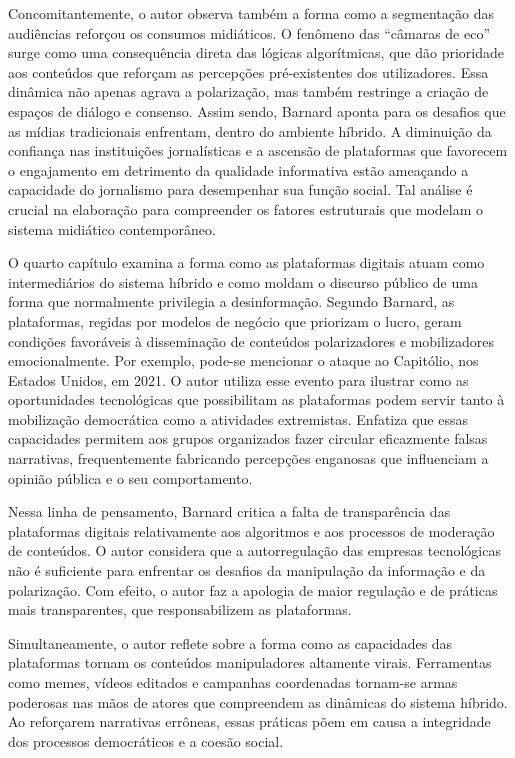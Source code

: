 \documentclass[portuguese]{textolivre}
\begin{document}
Concomitantemente, o autor observa também a forma como a segmentação das audiências reforçou os consumos midiáticos. O fenômeno das “câmaras de eco” surge como uma consequência direta das lógicas algorítmicas, que dão prioridade aos conteúdos que reforçam as percepções pré-existentes dos utilizadores. Essa dinâmica não apenas agrava a polarização, mas também restringe a criação de espaços de diálogo e consenso. Assim sendo, Barnard aponta para os desafios que as mídias tradicionais enfrentam, dentro do ambiente híbrido. A diminuição da confiança nas instituições jornalísticas e a ascensão de plataformas que favorecem o engajamento em detrimento da qualidade informativa estão ameaçando a capacidade do jornalismo para desempenhar sua função social. Tal análise é crucial na elaboração para compreender os fatores estruturais que modelam o sistema midiático contemporâneo.

O quarto capítulo examina a forma como as plataformas digitais atuam como intermediários do sistema híbrido e como moldam o discurso público de uma forma que normalmente privilegia a desinformação. Segundo Barnard, as plataformas, regidas por modelos de negócio que priorizam o lucro, geram condições favoráveis à disseminação de conteúdos polarizadores e mobilizadores emocionalmente. Por exemplo, pode-se mencionar o ataque ao Capitólio, nos Estados Unidos, em 2021. O autor utiliza esse evento para ilustrar como as oportunidades tecnológicas que possibilitam as plataformas podem servir tanto à mobilização democrática como a atividades extremistas. Enfatiza que essas capacidades permitem aos grupos organizados fazer circular eficazmente falsas narrativas, frequentemente fabricando percepções enganosas que influenciam a opinião pública e o seu comportamento. 

Nessa linha de pensamento, Barnard critica a falta de transparência das plataformas digitais relativamente aos algoritmos e aos processos de moderação de conteúdos. O autor considera que a autorregulação das empresas tecnológicas não é suficiente para enfrentar os desafios da manipulação da informação e da polarização. Com efeito, o autor faz a apologia de maior regulação e de práticas mais transparentes, que responsabilizem as plataformas.

Simultaneamente, o autor reflete sobre a forma como as capacidades das plataformas tornam os conteúdos manipuladores altamente virais. Ferramentas como memes, vídeos editados e campanhas coordenadas tornam-se armas poderosas nas mãos de atores que compreendem as dinâmicas do sistema híbrido. Ao reforçarem narrativas errôneas, essas práticas põem em causa a integridade dos processos democráticos e a coesão social.
\end{document}
